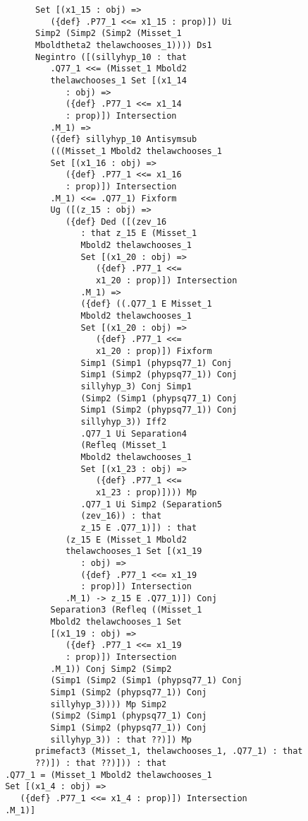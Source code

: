 \documentclass[12pt]{article}
\begin{document}
\begin{verbatim}
             Set [(x1_15 : obj) => 
                ({def} .P77_1 <<= x1_15 : prop)]) Ui 
             Simp2 (Simp2 (Simp2 (Misset_1 
             Mboldtheta2 thelawchooses_1)))) Ds1 
             Negintro ([(sillyhyp_10 : that 
                .Q77_1 <<= (Misset_1 Mbold2 
                thelawchooses_1 Set [(x1_14 
                   : obj) => 
                   ({def} .P77_1 <<= x1_14 
                   : prop)]) Intersection 
                .M_1) => 
                ({def} sillyhyp_10 Antisymsub 
                (((Misset_1 Mbold2 thelawchooses_1 
                Set [(x1_16 : obj) => 
                   ({def} .P77_1 <<= x1_16 
                   : prop)]) Intersection 
                .M_1) <<= .Q77_1) Fixform 
                Ug ([(z_15 : obj) => 
                   ({def} Ded ([(zev_16 
                      : that z_15 E (Misset_1 
                      Mbold2 thelawchooses_1 
                      Set [(x1_20 : obj) => 
                         ({def} .P77_1 <<= 
                         x1_20 : prop)]) Intersection 
                      .M_1) => 
                      ({def} ((.Q77_1 E Misset_1 
                      Mbold2 thelawchooses_1 
                      Set [(x1_20 : obj) => 
                         ({def} .P77_1 <<= 
                         x1_20 : prop)]) Fixform 
                      Simp1 (Simp1 (phypsq77_1) Conj 
                      Simp1 (Simp2 (phypsq77_1)) Conj 
                      sillyhyp_3) Conj Simp1 
                      (Simp2 (Simp1 (phypsq77_1) Conj 
                      Simp1 (Simp2 (phypsq77_1)) Conj 
                      sillyhyp_3)) Iff2 
                      .Q77_1 Ui Separation4 
                      (Refleq (Misset_1 
                      Mbold2 thelawchooses_1 
                      Set [(x1_23 : obj) => 
                         ({def} .P77_1 <<= 
                         x1_23 : prop)]))) Mp 
                      .Q77_1 Ui Simp2 (Separation5 
                      (zev_16)) : that 
                      z_15 E .Q77_1)]) : that 
                   (z_15 E (Misset_1 Mbold2 
                   thelawchooses_1 Set [(x1_19 
                      : obj) => 
                      ({def} .P77_1 <<= x1_19 
                      : prop)]) Intersection 
                   .M_1) -> z_15 E .Q77_1)]) Conj 
                Separation3 (Refleq ((Misset_1 
                Mbold2 thelawchooses_1 Set 
                [(x1_19 : obj) => 
                   ({def} .P77_1 <<= x1_19 
                   : prop)]) Intersection 
                .M_1)) Conj Simp2 (Simp2 
                (Simp1 (Simp2 (Simp1 (phypsq77_1) Conj 
                Simp1 (Simp2 (phypsq77_1)) Conj 
                sillyhyp_3)))) Mp Simp2 
                (Simp2 (Simp1 (phypsq77_1) Conj 
                Simp1 (Simp2 (phypsq77_1)) Conj 
                sillyhyp_3)) : that ??)]) Mp 
             primefact3 (Misset_1, thelawchooses_1, .Q77_1) : that 
             ??)]) : that ??)])) : that 
       .Q77_1 = (Misset_1 Mbold2 thelawchooses_1 
       Set [(x1_4 : obj) => 
          ({def} .P77_1 <<= x1_4 : prop)]) Intersection 
       .M_1)]



\end{verbatim}
\end{document}
